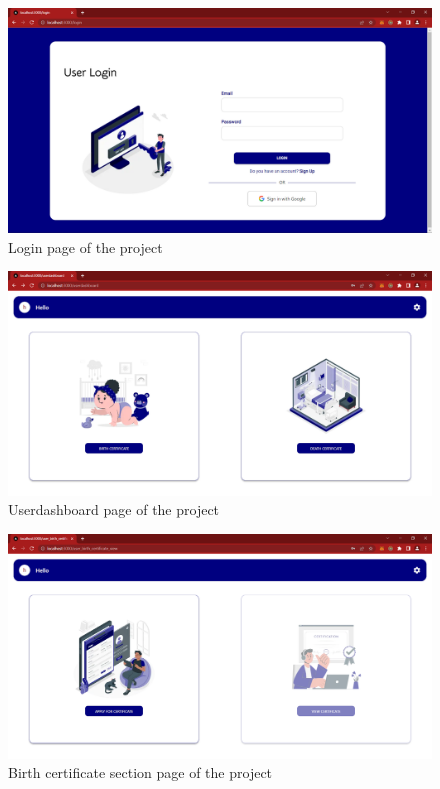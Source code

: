     \begin{figure}[H]
        \centering
        \includegraphics[width=\textwidth]{imgs/loginpage.png}
        \caption{Login page of the project}
        \label{fig:Login page of the project}
        \end{figure}

    \begin{figure}[H]
        \centering
        \includegraphics[width=\textwidth]{imgs/userdashboardpage.png}
        \caption{Userdashboard page of the project}
        \label{fig:Userdashboard page of the project}
        \end{figure}

    \begin{figure}[H]
        \centering
        \includegraphics[width=\textwidth]{imgs/birthdashboardpage.png}
        \caption{Birth certificate section page of the project}
        \label{fig:Birth certificate section page of the project}
        \end{figure}

